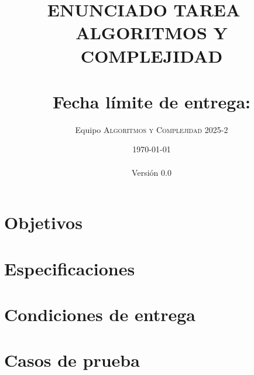 \documentclass[10pt,spanish]{article} %
\title{
  \huge
  \textbf{ENUNCIADO TAREA \tnum~ \\ ALGORITMOS Y COMPLEJIDAD} \\[1ex]
  \emph{\textquote{CppCorp}} \\[1ex]
  {\normalsize Fecha límite de entrega: \tcm{\deadline}}\\
  }
\author{
  Equipo \textsc{Algoritmos y Complejidad} 2025-2
}
\date{
  \small
  \today\\
  \currenttime\\
  Versión 0.0
}
\begin{document}
\maketitle
\thispagestyle{fancy} %
\vspace{-1.0\baselineskip}

\setlength{\epigraphwidth}{0.7\textwidth}



\setcounter{tocdepth}{2}
\tableofcontents

\newpage
\section{Objetivos}


\newpage
\section{Especificaciones}



\newpage
\section{Condiciones de entrega}


\newpage
\appendix

\section{Casos de prueba}\label{sec:test_cases}



\printbibliography
\end{document}
